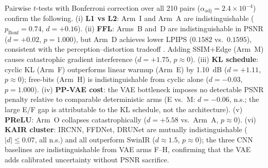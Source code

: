\documentclass[12pt, a4paper, twoside, openright]{book}
\begin{document}
Pairwise $t$-tests with Bonferroni correction over all 210 pairs ($\alpha_{\mathrm{adj}}=2.4\times10^{-4}$) confirm the following. (i) \textbf{L1 vs L2}: Arm~I and Arm~A are indistinguishable ($p_{\mathrm{Bonf}}=0.74$, $d=+0.16$). (ii) \textbf{FFL}: Arms~B and~D are indistinguishable in PSNR ($d=+0.02$, $p=1.000$), but Arm~D achieves lower LPIPS ($0.1582$ vs.\ $0.1595$), consistent with the perception--distortion tradeoff \cite{blau_perception_2018}. Adding SSIM+Edge (Arm~M) causes catastrophic gradient interference ($d=+1.75$, $p\approx 0$). (iii) \textbf{KL schedule}: cyclic KL (Arm~F) outperforms linear warmup (Arm~E) by 1.10~dB ($d=+1.11$, $p\approx 0$); free-bits (Arm~H) is indistinguishable from cyclic alone ($d=-0.03$, $p=1.000$). (iv) \textbf{PP-VAE cost}: the VAE bottleneck imposes no detectable PSNR penalty relative to comparable deterministic arms (E vs.\ M: $d=-0.06$, n.s.; the large E/F gap is attributable to the KL schedule, not the architecture). (v) \textbf{PReLU}: Arm~O collapses catastrophically ($d=+5.58$ vs.\ Arm~A, $p\approx 0$). (vi) \textbf{KAIR cluster}: IRCNN, FFDNet, DRUNet are mutually indistinguishable ($|d|\leq 0.07$, all n.s.) and all outperform SwinIR ($d\approx 1.5$, $p\approx 0$); the three CNN baselines are indistinguishable from VAE arms F--H, confirming that the VAE adds calibrated uncertainty without PSNR sacrifice.
\end{document}
